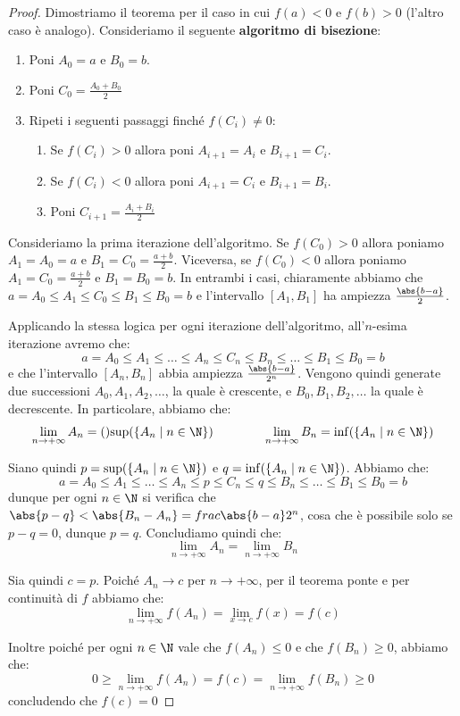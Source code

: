 \documentclass[a4paper, 12pt]{report}
\begin{document}
    \begin{proof}
        Dimostriamo il teorema per il caso in cui $f(a) < 0$ e $f(b) > 0$ (l'altro caso è analogo). Consideriamo il seguente \textbf{algoritmo di bisezione}:
        \begin{enumerate}
            \item Poni $A_0 = a$ e $B_0 = b$.
            \item Poni $C_0 = \frac{A_0+B_0}{2}$
            \item Ripeti i seguenti passaggi finché $f(C_i) \neq 0$:
            \begin{enumerate}
                \item Se $f(C_i) > 0$ allora poni $A_{i+1} = A_{i}$ e $B_{i+1} = C_i$.
                \item Se $f(C_i) < 0$ allora poni $A_{i+1} = C_i$ e $B_{i+1} = B_i$.
                \item Poni $C_{i+1} = \frac{A_i+B_i}{2}$
            \end{enumerate}
        \end{enumerate}

        Consideriamo la prima iterazione dell'algoritmo. Se $f(C_0) > 0$ allora poniamo $A_1 = A_0 = a$ e $B_1 = C_0 = \frac{a+b}{2}$. Viceversa, se $f(C_0) < 0$ allora poniamo $A_1 = C_0 = \frac{a+b}{2}$ e $B_1 = B_0 = b$. In entrambi i casi, chiaramente abbiamo che $a = A_0 \leq A_1 \leq C_0 \leq B_1 \leq B_0 = b$ e l'intervallo $[A_1, B_1]$ ha ampiezza $\frac{\abs{b - a}}{2}$.

        Applicando la stessa logica per ogni iterazione dell'algoritmo, all'$n$-esima iterazione avremo che:
        \[a = A_0 \leq A_1 \leq \ldots \leq A_n \leq C_n \leq B_n \leq \ldots \leq B_1 \leq B_0 = b\]
        e che l'intervallo $[A_n, B_n]$ abbia ampiezza $\frac{\abs{b - a}}{2^n}$. Vengono quindi generate due successioni $A_0, A_1, A_2, \ldots$, la quale è crescente, e $B_0, B_1, B_2, \ldots$ la quale è decrescente. In particolare, abbiamo che:
        \[\lim_{n \to +\infty} A_n = ()\mathrm{sup}(\{A_n \mid n \in \N\}) \qquad\qquad \lim_{n \to +\infty} B_n = \mathrm{inf}(\{A_n \mid n \in \N\})\]

        Siano quindi $p =  \mathrm{sup}(\{A_n \mid n \in \N\})$ e $q =  \mathrm{inf}(\{A_n \mid n \in \N\})$. Abbiamo che:
        \[a = A_0 \leq A_1 \leq \ldots \leq A_n \leq p \leq C_n \leq q \leq B_n \leq \ldots \leq B_1 \leq B_0 = b\]
        dunque per ogni $n \in \N$ si verifica che $\abs{p-q} < \abs{B_n-A_n} = frac{\abs{b - a}}{2^n}$, cosa che è possibile solo se $p-q = 0$, dunque $p = q$. Concludiamo quindi che:
        \[\lim_{n \to +\infty} A_n = \lim_{n \to +\infty} B_n\]
        
        Sia quindi $c = p$. Poiché $A_n \to c$ per $n \to +\infty$, per il teorema ponte e per continuità di $f$ abbiamo che:
        \[\lim_{n \to +\infty} f(A_n) = \lim_{x \to c} f(x) = f(c)\]

        Inoltre poiché per ogni $n \in \N$ vale che $f(A_n) \leq 0$ e che $f(B_n) \geq 0$, abbiamo che: 
        \[0 \geq \lim_{n \to +\infty} f(A_n) = f(c) = \lim_{n \to +\infty} f(B_n) \geq 0\]
        concludendo che $f(c) = 0$
        
    \end{proof}
\end{document}
